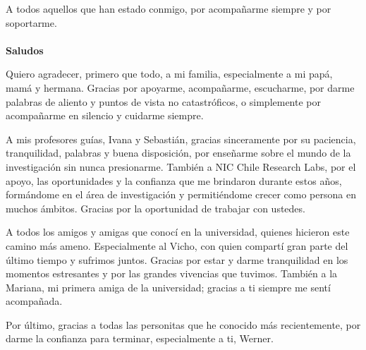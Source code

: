 \documentclass[
	spanish, %
	letterpaper, oneside
]{book}
\begin{document}
\begin{dedicatory}
	A todos aquellos que han estado conmigo, por acompañarme siempre y por soportarme. \\
	~ \\
	\textbf{Saludos}
\end{dedicatory}

\begin{acknowledgments}
	
\noindent Quiero agradecer, primero que todo, a mi familia, especialmente a mi papá, mamá y hermana. Gracias por apoyarme, acompañarme, escucharme, por darme palabras de aliento y puntos de vista no catastróficos, o simplemente por acompañarme en silencio y cuidarme siempre.

\noindent A mis profesores guías, Ivana y Sebastián, gracias sinceramente por su paciencia, tranquilidad, palabras y buena disposición, por enseñarme sobre el mundo de la investigación sin nunca presionarme.  
También a NIC Chile Research Labs, por el apoyo, las oportunidades y la confianza que me brindaron durante estos años, formándome en el área de investigación y permitiéndome crecer como persona en muchos ámbitos. Gracias por la oportunidad de trabajar con ustedes.

\noindent A todos los amigos y amigas que conocí en la universidad, quienes hicieron este camino más ameno. Especialmente al Vicho, con quien compartí gran parte del último tiempo y sufrimos juntos. Gracias por estar y darme tranquilidad en los momentos estresantes y por las grandes vivencias que tuvimos.  
También a la Mariana, mi primera amiga de la universidad; gracias a ti siempre me sentí acompañada.

\noindent Por último, gracias a todas las personitas que he conocido más recientemente, por darme la confianza para terminar, especialmente a ti, Werner.









\end{acknowledgments}

\templateIndex

\templateFinalcfg


\end{document}
